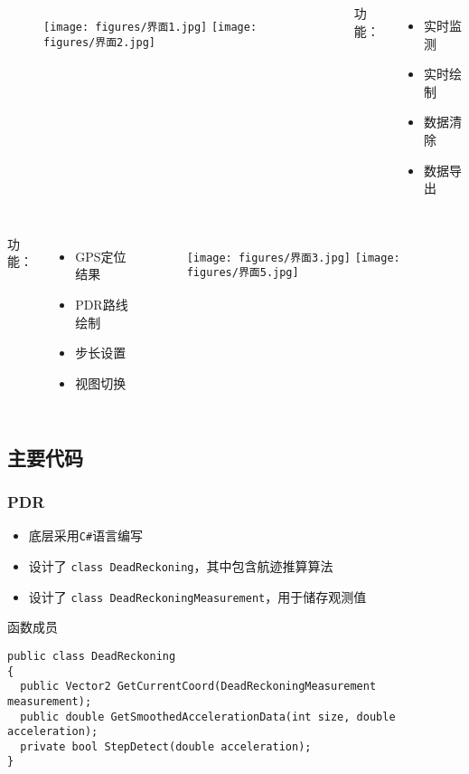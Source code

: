 \documentclass[10pt,xcolor=dvipsnames,fontset=none,punct=CCT]{ctexbeamer}
\begin{document}
\begin{frame}
  \begin{columns}
  \begin{figure}[ht]
    \centering
    \texttt{[image: figures/界面1.jpg]}
    \texttt{[image: figures/界面2.jpg]}
  \end{figure}
  功能：
  \begin{itemize}
    \item 实时监测
    \item 实时绘制
    \item 数据清除
    \item 数据导出
  \end{itemize}
  \end{columns}
\end{frame}

\begin{frame}
  \begin{columns}
    功能：
    \begin{itemize}
      \item GPS定位结果
      \item PDR路线绘制
      \item 步长设置
      \item 视图切换
    \end{itemize}
    \begin{figure}[ht]
      \centering
      \texttt{[image: figures/界面3.jpg]}
      \texttt{[image: figures/界面5.jpg]}
    \end{figure}
    \end{columns}
\end{frame}

\subsection{主要代码}
\begin{frame}[fragile]
  \frametitle{PDR}
  \begin{itemize}
    \item 底层采用\texttt{C\#}语言编写
    \item 设计了 \texttt{class DeadReckoning}，其中包含航迹推算算法
    \item 设计了 \texttt{class DeadReckoningMeasurement}，用于储存观测值
  \end{itemize}
  \begin{block}{函数成员}
  \begin{verbatim}
public class DeadReckoning
{
  public Vector2 GetCurrentCoord(DeadReckoningMeasurement measurement);
  public double GetSmoothedAccelerationData(int size, double acceleration);
  private bool StepDetect(double acceleration);
}
  \end{verbatim}
  \end{block}
\end{frame}
\end{document}
